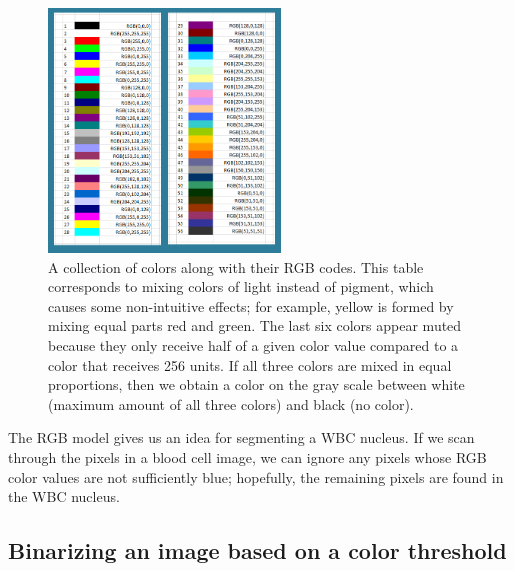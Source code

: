 \begin{figure}[h]
\centering
\mySfFamily
\includegraphics[width = 0.55\textwidth]{../images/RGB_color_chart.png}
\caption{A collection of colors along with their RGB codes. This table corresponds to mixing colors of light instead of pigment, which causes some non-intuitive effects; for example, yellow is formed by mixing equal parts red and green. The last six colors appear muted because they only receive half of a given color value compared to a color that receives 256 units. If all three colors are mixed in equal proportions, then we obtain a color on the gray scale between white (maximum amount of all three colors) and black (no color).}
\label{fig:RGB_color_chart}
\end{figure}

The RGB model gives us an idea for segmenting a WBC nucleus. If we scan through the pixels in a blood cell image, we can ignore any pixels whose RGB color values are not sufficiently blue; hopefully, the remaining pixels are found in the WBC nucleus.\\

\begin{qbox}\end{qbox}

\FloatBarrier
{}
\subsection{Binarizing an image based on a color threshold}

